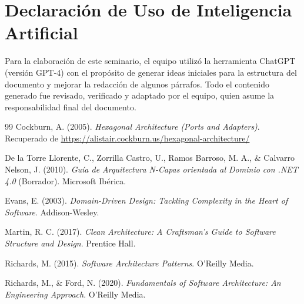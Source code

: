 \documentclass[12pt,a4paper]{article}
\begin{document}
\section*{Declaración de Uso de Inteligencia Artificial}

Para la elaboración de este seminario, el equipo utilizó la herramienta ChatGPT (versión GPT-4) con el propósito de generar ideas iniciales para la estructura del documento y mejorar la redacción de algunos párrafos. Todo el contenido generado fue revisado, verificado y adaptado por el equipo, quien asume la responsabilidad final del documento.

\newpage

 \begin{thebibliography}{99}
 Cockburn, A. (2005). \textit{Hexagonal Architecture (Ports and Adapters)}. Recuperado de \url{https://alistair.cockburn.us/hexagonal-architecture/}
 
 De la Torre Llorente, C., Zorrilla Castro, U., Ramos Barroso, M. A., \& Calvarro Nelson, J. (2010). \textit{Guía de Arquitectura N-Capas orientada al Dominio con .NET 4.0} (Borrador). Microsoft Ibérica.
 
 Evans, E. (2003). \textit{Domain-Driven Design: Tackling Complexity in the Heart of Software}. Addison-Wesley.
 
 Martin, R. C. (2017). \textit{Clean Architecture: A Craftsman's Guide to Software Structure and Design}. Prentice Hall.
 
 Richards, M. (2015). \textit{Software Architecture Patterns}. O'Reilly Media.
 
 Richards, M., \& Ford, N. (2020). \textit{Fundamentals of Software Architecture: An Engineering Approach}. O'Reilly Media.
 \end{thebibliography}
\end{document}
